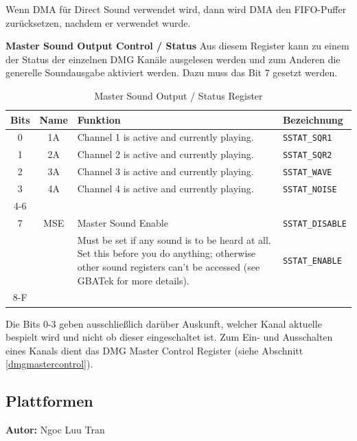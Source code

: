 \documentclass[11pt,a4paper]{scrartcl}
\newcommand{\AutorNgoc} {
    \vspace{-4mm}
    \large \textbf{Autor:} Ngoc Luu Tran \normalsize
    \vspace{2mm}
}
\newcommand{\paratitle}[1] {
    \vspace{5mm}
    \large \textbf{#1} \normalsize
    \vspace{2mm}\newline
}
\begin{document}
Wenn DMA f\"ur Direct Sound verwendet wird, dann wird DMA den FIFO-Puffer zur\"ucksetzen, nachdem er verwendet wurde.


\newpage	
\paratitle{Master Sound Output Control / Status} \label{mastersoundoutputcontrol}
Aus diesem Register kann zu einem der Status der einzelnen DMG Kan\"ale ausgelesen werden und zum Anderen die generelle Soundausgabe aktiviert werden. Dazu muss das Bit 7 gesetzt werden.

\begin{table}[h]
	\centering
    \begin{tabular}{ c | c | p{10cm} | l } 
	    \textbf{Bits} & \textbf{Name} & \textbf{Funktion} & \textbf{Bezeichnung} \\
	    \hline
	    0 & 1A & Channel 1 is active and currently playing. & \verb|SSTAT_SQR1| \\
	    \hline
	    1 & 2A & Channel 2 is active and currently playing. & \verb|SSTAT_SQR2| \\
	    \hline
	    2 & 3A & Channel 3 is active and currently playing. & \verb|SSTAT_WAVE| \\
	    \hline
	    3 & 4A & Channel 4 is active and currently playing. & \verb|SSTAT_NOISE| \\
	    \hline
	    4-6 & & & \\
	    \hline
	    7 & MSE & Master Sound Enable & \verb|SSTAT_DISABLE| \\
	      &     & Must be set if any sound is to be heard at all. Set this before you do anything; otherwise other sound registers can't be accessed (see GBATek for more details). & \verb|SSTAT_ENABLE| \\
	    \hline
	    8-F & & & \\
	\end{tabular}
	\caption{Master Sound Output / Status Register}
	\label{table:MasterSoundOutputControlStatusRegister}
\end{table}

Die Bits 0-3 geben ausschlie{\ss}lich dar\"uber Auskunft, welcher Kanal aktuelle bespielt wird und nicht ob dieser eingeschaltet ist. Zum Ein- und Ausschalten eines Kanals dient das DMG Master Control Register (siehe Abschnitt \ref{dmgmastercontrol}).



\newpage
\subsection{Plattformen} \label{Plattformen}
\AutorNgoc
\end{document}
